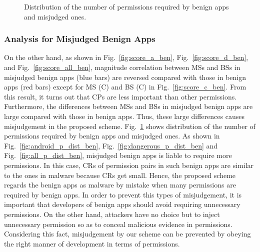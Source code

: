 \documentclass{ieeeaccess}
\newcommand{\myfigurename}{Fig.}
\begin{document}
\begin{figure}[t]
{  } 
  \caption{Distribution of the number of permissions required by benign apps and misjudged ones.}
  \label{fig:permission_distribution_ben}
\end{figure}
\subsubsection{Analysis for Misjudged Benign Apps} \label{subsec:analysis_mis_benign}
On the other hand, as shown in \myfigurename~\ref{fig:score_a_ben}, \myfigurename~\ref{fig:score_d_ben}, and \myfigurename~\ref{fig:score_all_ben}, magnitude correlation between MSs and BSs in misjudged benign apps (blue bars) are reversed compared with those in benign apps (red bars) except for MS (C) and BS (C) in \myfigurename~\ref{fig:score_c_ben}.
From this result, it turns out that CPs are less important than other permissions.
Furthermore, the differences between MSs and BSs in misjudged benign apps are large compared with those in benign apps.
Thus, these large differences causes misjudgement in the proposed scheme.
\myfigurename~\ref{fig:permission_distribution_ben} shows distribution of the number of permissions required by benign apps and misjudged ones.
As shown in \myfigurename~\ref{fig:android_p_dist_ben}, \myfigurename~\ref{fig:dangerous_p_dist_ben} and \myfigurename~\ref{fig:all_p_dist_ben}, misjudged benign apps is liable to require more permissions. 
In this case, CRs of permission pairs in such benign apps are similar to the ones in malware because CRs get small.
Hence, the proposed scheme regards the benign apps as malware by mistake when many permissions are required by benign apps.
In order to prevent this types of misjudgement, it is important that developers of benign apps should avoid requiring unnecessary permissions.
On the other hand, attackers have no choice but to inject unnecessary permission so as to conceal malicious evidence in permissions.
Considering this fact, misjudgement by our scheme can be prevented by obeying the right manner of development in terms of permissions.  
\end{document}
